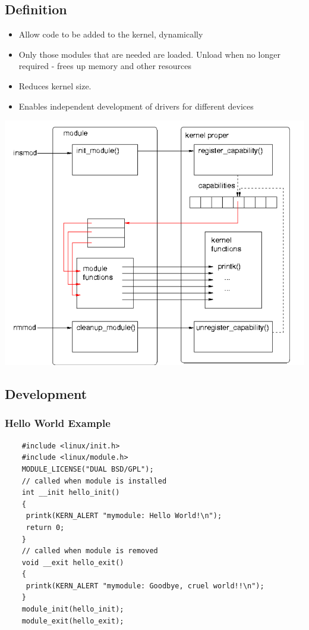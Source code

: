 \documentclass[12pt]{article}
\begin{document}
\subsection{Definition}
\begin{itemize}
    \item Allow code to be added to the kernel, dynamically 
    \item Only those modules that are needed are loaded. Unload when no longer required - frees up memory and other resources 
    \item Reduces kernel size. 
    \item Enables independent development of drivers for different 
    devices
\end{itemize}
\includegraphics[width=\textwidth]{KernelWorking.png}
\subsection{Development}
\subsubsection{Hello World Example}
\begin{lstlisting}
    #include <linux/init.h> 
    #include <linux/module.h> 
    MODULE_LICENSE("DUAL BSD/GPL"); 
    // called when module is installed 
    int __init hello_init() 
    { 
     printk(KERN_ALERT "mymodule: Hello World!\n"); 
     return 0; 
    } 
    // called when module is removed 
    void __exit hello_exit() 
    { 
     printk(KERN_ALERT "mymodule: Goodbye, cruel world!!\n"); 
    } 
    module_init(hello_init); 
    module_exit(hello_exit);
\end{lstlisting}
\end{document}
